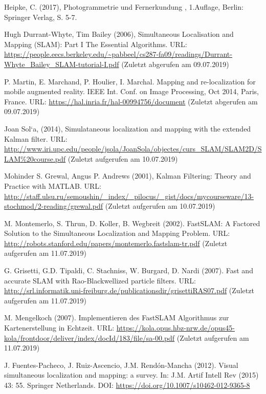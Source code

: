 \documentclass[12pt,oneside]{scrreprt}
\begin{document}
  \begin{thebibliography}{10}
  
  
     Heipke, C. (2017), \glqq Photogrammetrie und Fernerkundung \grqq, 1.Auflage, Berlin: Springer Verlag, S. 5-7.
    
     Hugh Durrant-Whyte, Tim Bailey (2006), Simultaneous Localisation and Mapping (SLAM): Part I The Essential Algorithms. URL: \url{https://people.eecs.berkeley.edu/~pabbeel/cs287-fa09/readings/Durrant-Whyte_Bailey_SLAM-tutorial-I.pdf} (Zuletzt abgerufen am 09.07.2019)
    

	 P. Martin, E. Marchand, P. Houlier, I. Marchal. Mapping and re-localization for mobile augmented reality. IEEE Int. Conf. on Image Processing, Oct 2014, Paris, France.
URL: \url{https://hal.inria.fr/hal-00994756/document} (Zuletzt abgerufen am 09.07.2019) 

	 Joan Sol`a, (2014), Simulataneous localization and mapping with the extended Kalman filter. URL: \url{http://www.iri.upc.edu/people/jsola/JoanSola/objectes/curs_SLAM/SLAM2D/SLAM\%20course.pdf} (Zuletzt aufgerufen am 10.07.2019)
    
     Mohinder S. Grewal, Angus P. Andrews (2001), Kalman Filtering: Theory and Practice with MATLAB. URL: \url{http://staff.ulsu.ru/semoushin/_index/_pilocus/_gist/docs/mycourseware/13-stochmod/2-reading/grewal.pdf} (Zuletzt aufgerufen am 10.07.2019)

	 M. Montemerlo, S. Thrun, D. Koller, B. Wegbreit (2002). FastSLAM: A Factored Solution to the Simultaneous Localization and Mapping Problem. URL: \url{http://robots.stanford.edu/papers/montemerlo.fastslam-tr.pdf} (Zuletzt aufgerufen am 11.07.2019) 
	
	 G. Grisetti, G.D. Tipaldi, C. Stachniss, W. Burgard, D. Nardi (2007). Fast and accurate SLAM with Rao-Blackwellized particle filters. URL: \url{http://srl.informatik.uni-freiburg.de/publicationsdir/grisettiRAS07.pdf} (Zuletzt aufgerufen am 11.07.2019)

 M. Mengelkoch (2007). Implementieren des FastSLAM Algorithmus zur
Kartenerstellung in Echtzeit. URL: \url{https://kola.opus.hbz-nrw.de/opus45-kola/frontdoor/deliver/index/docId/183/file/sa-00.pdf} (Zuletzt aufgerufen am 11.07.2019)

 J. Fuentes-Pacheco, J. Ruiz-Ascencio, J.M. Rendón-Mancha (2012). Visual simultaneous localization and mapping: a survey. In: J.M. Artif Intell Rev (2015) 43: 55. Springer Netherlands. DOI: \url{https://doi.org/10.1007/s10462-012-9365-8}


\end{thebibliography}
\end{document}
